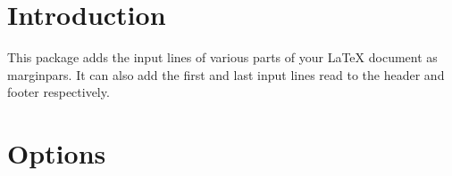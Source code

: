 \documentclass{scrartcl}
\begin{document}
\section{Introduction}
This package adds the input lines of various parts of your LaTeX
document as marginpars.
It can also add the first and last input lines read to the header and
footer respectively.



\section{Options}
\end{document}
